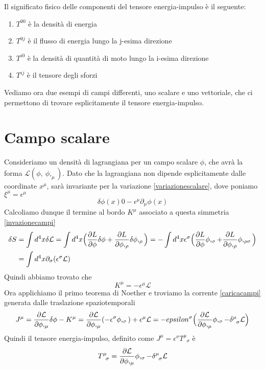     Il significato fisico delle componenti del tensore energia-impulso è il seguente: 
\begin{enumerate}
    \item $T^{00}$ è la densità di energia
    \item $T^{0j}$ è il flusso di energia lungo la j-esima direzione
    \item $T^{i0}$ è la densità di quantità di moto lungo la i-esima direzione
    \item $T^{ij}$ è il tensore degli sforzi
\end{enumerate}

    Vediamo ora due esempi di campi differenti, uno scalare e uno vettoriale, che ci permettono di trovare esplicitamente il tensore energia-impulso.

\section{Campo scalare}
    Consideriamo un densità di lagrangiana per un campo scalare $\phi$, che avrà la forma $\mathcal L(\phi,~\phi,_\mu)$. Dato che la lagrangiana non dipende esplicitamente dalle coordinate $x^\mu$, sarà invariante per la variazione \eqref{variazionescalare}, dove poniamo $\xi^\mu = \epsilon^\mu$
\begin{equation}
    \delta \phi(x) 0 - \epsilon^\mu \partial_\mu \phi(x)
\end{equation}
    Calcoliamo dunque il termine al bordo $K^\mu$ associato a questa simmetria \eqref{invazionecampi}
\begin{equation*}
\begin{aligned}
    \delta S & = \int d^4 x \delta \mathcal L = \int d^4 x \Big ( \frac{\partial L}{\partial\phi} \delta \phi + \frac{\partial L}{\partial\phi,_\rho} \delta \phi,_\rho \Big) = - \int d^4 x \epsilon^\sigma \Big ( \frac{\partial L}{\partial\phi} \phi,_\sigma + \frac{\partial L}{\partial\phi,_\rho} \phi,_{\rho\sigma} \Big) \\ & = \int d^4 x \partial_\sigma (\epsilon^\sigma \mathcal L)
\end{aligned}
\end{equation*}
    Quindi abbiamo trovato che 
\begin{equation*}
    K^\mu = - \epsilon^\mu \mathcal L
\end{equation*}
    Ora applichiamo il primo teorema di Noether e troviamo la corrente \eqref{caricacampi} generata dalle traslazione spaziotemporali
\begin{equation*}
    J^\mu = \pdv{\mathcal L}{\phi,_\mu} \delta \phi - K^\mu = \pdv{\mathcal L}{\phi,_\mu} (- \epsilon^\sigma \phi,_\sigma) + \epsilon^\mu \mathcal L = - epsilon^\sigma \Big ( \pdv{\mathcal L}{\phi,_\mu} \phi,_\sigma - \delta^\mu_{\phantom \mu \sigma} \mathcal L \Big)
\end{equation*}
    Quindi il tensore energia-impulso, definito come $J^\mu = \epsilon^\sigma T^\mu_{\phantom \mu \sigma}$ è
\begin{equation}
    T^\mu_{\phantom \mu \sigma} = \pdv{\mathcal L}{\phi,_\mu} \phi,_\sigma - \delta^\mu_{\phantom \mu \sigma} \mathcal L
\end{equation}

